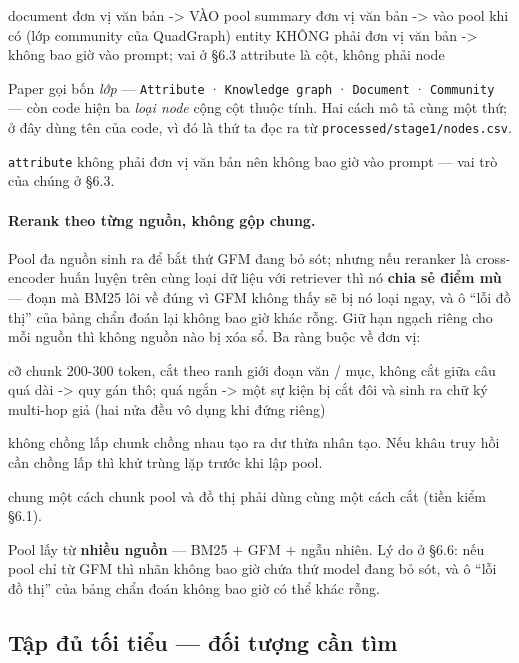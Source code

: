\documentclass[11pt,a4paper]{article}
\begin{document}
\begin{dia}
document   đơn vị văn bản  ->  VÀO pool
summary    đơn vị văn bản  ->  vào pool khi có (lớp community của QuadGraph)
entity     KHÔNG phải đơn vị văn bản  ->  không bao giờ vào prompt; vai ở §6.3
attribute  là cột, không phải node
\end{dia}

Paper gọi bốn \emph{lớp} --- \texttt{Attribute} · \texttt{Knowledge graph} ·
\texttt{Document} · \texttt{Community} --- còn code hiện ba \emph{loại node} cộng cột thuộc
tính. Hai cách mô tả cùng một thứ; ở đây dùng tên của code, vì đó là thứ ta đọc ra từ
\texttt{processed/stage1/nodes.csv}.

\texttt{attribute} không phải đơn vị văn bản nên không bao giờ vào prompt --- vai trò của
chúng ở \S6.3.

\paragraph{Rerank theo từng nguồn, không gộp chung.} Pool đa nguồn sinh ra để bắt thứ GFM
đang bỏ sót; nhưng nếu reranker là cross-encoder huấn luyện trên cùng loại dữ liệu với
retriever thì nó \textbf{chia sẻ điểm mù} --- đoạn mà BM25 lôi về đúng vì GFM không thấy sẽ
bị nó loại ngay, và ô ``lỗi đồ thị'' của bảng chẩn đoán lại không bao giờ khác rỗng. Giữ
hạn ngạch riêng cho mỗi nguồn thì không nguồn nào bị xóa sổ. Ba ràng buộc về đơn vị:

\begin{dia}
cỡ chunk     200-300 token, cắt theo ranh giới đoạn văn / mục, không cắt giữa câu
             quá dài -> quy gán thô; quá ngắn -> một sự kiện bị cắt đôi và sinh ra
             chữ ký multi-hop giả (hai nửa đều vô dụng khi đứng riêng)

không chồng lấp   chunk chồng nhau tạo ra dư thừa nhân tạo. Nếu khâu truy hồi cần
             chồng lấp thì khử trùng lặp trước khi lập pool.

chung một cách chunk   pool và đồ thị phải dùng cùng một cách cắt (tiền kiểm §6.1).
\end{dia}

Pool lấy từ \textbf{nhiều nguồn} --- BM25 $+$ GFM $+$ ngẫu nhiên. Lý do ở \S6.6: nếu pool
chỉ từ GFM thì nhãn không bao giờ chứa thứ model đang bỏ sót, và ô ``lỗi đồ thị'' của bảng
chẩn đoán không bao giờ có thể khác rỗng.

\subsection{Tập đủ tối tiểu --- đối tượng cần tìm}
\end{document}
